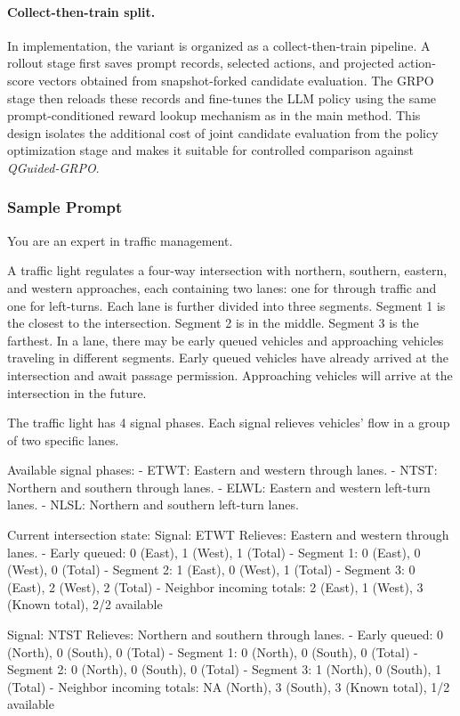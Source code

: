 \paragraph{Collect-then-train split.}
In implementation, the variant is organized as a collect-then-train pipeline. A rollout stage first saves prompt records, selected actions, and projected action-score vectors obtained from snapshot-forked candidate evaluation. The GRPO stage then reloads these records and fine-tunes the LLM policy using the same prompt-conditioned reward lookup mechanism as in the main method. This design isolates the additional cost of joint candidate evaluation from the policy optimization stage and makes it suitable for controlled comparison against \textit{QGuided-GRPO}.


\subsubsection{Sample Prompt}
\label{appendix:sample_prompt}
You are an expert in traffic management.

A traffic light regulates a four-way intersection with northern, southern, eastern, and western approaches, each containing two lanes: one for through traffic and one for left-turns. Each lane is further divided into three segments. Segment 1 is the closest to the intersection. Segment 2 is in the middle. Segment 3 is the farthest. In a lane, there may be early queued vehicles and approaching vehicles traveling in different segments. Early queued vehicles have already arrived at the intersection and await passage permission. Approaching vehicles will arrive at the intersection in the future.

The traffic light has 4 signal phases. Each signal relieves vehicles' flow in a group of two specific lanes.

Available signal phases:
- ETWT: Eastern and western through lanes.
- NTST: Northern and southern through lanes.
- ELWL: Eastern and western left-turn lanes.
- NLSL: Northern and southern left-turn lanes.

Current intersection state:
Signal: ETWT
Relieves: Eastern and western through lanes.
- Early queued: 0 (East), 1 (West), 1 (Total)
- Segment 1: 0 (East), 0 (West), 0 (Total)
- Segment 2: 1 (East), 0 (West), 1 (Total)
- Segment 3: 0 (East), 2 (West), 2 (Total)
- Neighbor incoming totals: 2 (East), 1 (West), 3 (Known total), 2/2 available

Signal: NTST
Relieves: Northern and southern through lanes.
- Early queued: 0 (North), 0 (South), 0 (Total)
- Segment 1: 0 (North), 0 (South), 0 (Total)
- Segment 2: 0 (North), 0 (South), 0 (Total)
- Segment 3: 1 (North), 0 (South), 1 (Total)
- Neighbor incoming totals: NA (North), 3 (South), 3 (Known total), 1/2 available

